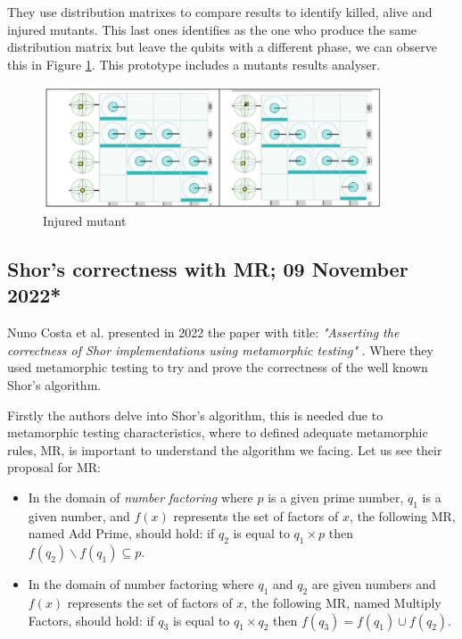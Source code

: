 \begin{itemize}
They use distribution matrixes to compare results to identify killed, alive and injured mutants. This last ones identifies as the one who produce the same distribution matrix but leave the qubits with a different phase, we can observe this in Figure \ref{Fig:QuMUInjured}. This prototype includes a mutants results analyser.

\begin{figure}[H]
        \centering
        \includegraphics[width=0.9\textwidth]{TFM/photos/QuMuInjured.png}
        \caption{Injured mutant \cite{de2022quantum}} 
        \label{Fig:QuMUInjured}
\end{figure}

\vspace{15pt}
\subsection{Shor's correctness with MR; 09 November 2022*}

Nuno Costa et al. presented in 2022 the paper with title: \textit{"Asserting the correctness of Shor implementations using metamorphic testing"} \cite{costa2022asserting}. Where they used metamorphic testing to try and prove the correctness of the well known Shor's algorithm.\newline

Firstly the authors delve into Shor's algorithm, this is needed due to metamorphic testing  characteristics, where to defined adequate metamorphic rules, MR, is important to understand the algorithm we facing. Let us see their proposal for MR:
\begin{itemize}
    \item In the domain of \textit{number factoring} where $p$ is a given prime number, $q_{1}$ is a given number, and $f(x)$ represents the set of factors of $x$, the following MR, named Add Prime, should hold: if $q_{2}$ is equal to $q_{1}\times p$ then $f(q_{2}) \backslash f (q_{1}) \subseteq {p}$.
    \item In the domain of number factoring where $q_{1}$ and $q_{2}$ are given numbers and $f(x)$ represents the set of factors of $x$, the following MR, named Multiply Factors, should hold: if $q_{3}$ is equal to $q_{1}\times q_{2}$ then $f(q_{3})=f(q_{1})\cup f(q_{2})$.
\end{itemize}


\end{itemize}
